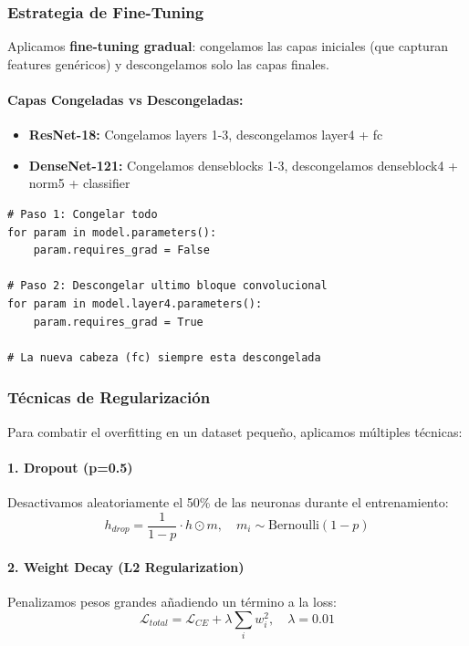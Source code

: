 \documentclass[12pt,a4paper]{article}
\begin{document}
\subsubsection{Estrategia de Fine-Tuning}

Aplicamos \textbf{fine-tuning gradual}: congelamos las capas iniciales (que capturan features genéricos) y descongelamos solo las capas finales.

\paragraph{Capas Congeladas vs Descongeladas:}
\begin{itemize}
    \item \textbf{ResNet-18:} Congelamos layers 1-3, descongelamos layer4 + fc
    \item \textbf{DenseNet-121:} Congelamos denseblocks 1-3, descongelamos denseblock4 + norm5 + classifier
\end{itemize}

\begin{lstlisting}[caption={Estrategia de congelado en ResNet-18}]
# Paso 1: Congelar todo
for param in model.parameters():
    param.requires_grad = False

# Paso 2: Descongelar ultimo bloque convolucional
for param in model.layer4.parameters():
    param.requires_grad = True

# La nueva cabeza (fc) siempre esta descongelada
\end{lstlisting}

\subsubsection{Técnicas de Regularización}

Para combatir el overfitting en un dataset pequeño, aplicamos múltiples técnicas:

\paragraph{1. Dropout (p=0.5)}
Desactivamos aleatoriamente el 50\% de las neuronas durante el entrenamiento:
\begin{equation}
h_{drop} = \frac{1}{1-p} \cdot h \odot m, \quad m_i \sim \text{Bernoulli}(1-p)
\end{equation}

\paragraph{2. Weight Decay (L2 Regularization)}
Penalizamos pesos grandes añadiendo un término a la loss:
\begin{equation}
\mathcal{L}_{total} = \mathcal{L}_{CE} + \lambda \sum_{i} w_i^2, \quad \lambda = 0.01
\end{equation}
\end{document}
